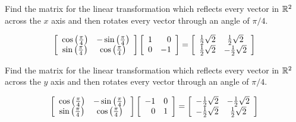 \begin{enumialphparenastyle}
\begin{ex} Find the matrix for the linear transformation which reflects every
vector in $\mathbb{R}^{2}$ across the $x$ axis and then rotates every vector
through an angle of $\pi /4$.
\begin{sol}
\[
\left[
\begin{array}{cc}
\cos \left( \frac{\pi }{4}\right)  & -\sin \left( \frac{\pi }{4}\right)  \\
\sin \left( \frac{\pi }{4}\right)  & \cos \left( \frac{\pi }{4}\right)
\end{array}
\right] \left[
\begin{array}{rr}
1 & 0 \\
0 & -1
\end{array}
\right] = \left[
\begin{array}{cc}
\frac{1}{2}\sqrt{2} & \frac{1}{2}\sqrt{2} \\
\frac{1}{2}\sqrt{2} & -\frac{1}{2}\sqrt{2}
\end{array}
\right]
\]
\end{sol}
\end{ex}

\begin{ex} Find the matrix for the linear transformation which reflects every
vector in $\mathbb{R}^{2}$ across the $y$ axis and then rotates every vector
through an angle of $\pi /4$.
\begin{sol}
\[
\left[
\begin{array}{cc}
\cos \left( \frac{\pi }{4}\right)  & -\sin \left( \frac{\pi }{4}\right)  \\
\sin \left( \frac{\pi }{4}\right)  & \cos \left( \frac{\pi }{4}\right)
\end{array}
\right] \left[
\begin{array}{rr}
-1 & 0 \\
0 & 1
\end{array}
\right] = \left[
\begin{array}{cc}
-\frac{1}{2}\sqrt{2} & -\frac{1}{2}\sqrt{2} \\
-\frac{1}{2}\sqrt{2} & \frac{1}{2}\sqrt{2}
\end{array}
\right]
\]
\end{sol}
\end{ex}


\end{enumialphparenastyle}
